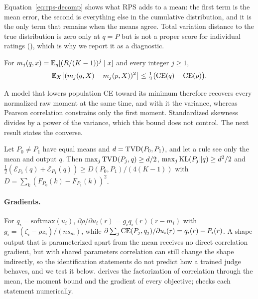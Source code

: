 Equation~\eqref{eq:rps-decomp} shows what RPS adds to a mean: the first term is the mean error, the second is everything else in the cumulative distribution, and it is the only term that remains when the means agree.
Total variation distance to the true distribution is zero only at $q=P$ but is not a proper score for individual ratings (), which is why we report it as a diagnostic.

\begin{proposition}
\label{prop:moments}
For $m_j(q,x)=\mathbb{E}_q[(R/(K-1))^j\mid x]$ and every integer $j\ge1$,
\[
\mathbb{E}_X\bigl[(m_j(q,X)-m_j(p,X))^2\bigr]\le\tfrac12\bigl(\mathrm{CE}(q)-\mathrm{CE}(p)\bigr).
\]
\end{proposition}

A model that lowers population CE toward its minimum therefore recovers every normalized raw moment at the same time, and with it the variance, whereas Pearson correlation constrains only the first moment.
Standardized skewness divides by a power of the variance, which this bound does not control.
The next result states the converse.

\begin{proposition}
\label{prop:lower}
Let $P_0\ne P_1$ have equal means and $d=\mathrm{TVD}(P_0,P_1)$, and let a rule see only the mean and output $q$.
Then $\max_j\mathrm{TVD}(P_j,q)\ge d/2$, $\max_j\mathrm{KL}(P_j\|q)\ge d^2/2$ and $\tfrac12(\mathcal E_{P_0}(q)+\mathcal E_{P_1}(q))\ge D(P_0,P_1)/(4(K-1))$ with $D=\sum_k(F_{P_0}(k)-F_{P_1}(k))^2$.
\end{proposition}

\paragraph{Gradients.}
For $q_i=\mathrm{softmax}(u_i)$, $\partial\rho/\partial u_i(r)=g_iq_i(r)(r-m_i)$ with $g_i=(\zeta_i-\rho z_i)/(ns_m)$, while $\partial\sum_j\mathrm{CE}(P_j,q_j)/\partial u_i(r)=q_i(r)-P_i(r)$.
A shape output that is parameterized apart from the mean receives no direct correlation gradient, but with shared parameters correlation can still change the shape indirectly, so the identification statements do not predict how a trained judge behaves, and we test it below.
 derives the factorization of correlation through the mean, the moment bound and the gradient of every objective;  checks each statement numerically.

